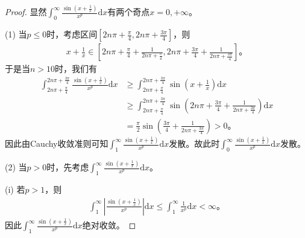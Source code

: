 \documentclass[../../main.tex]{subfiles}%
\begin{document}
\begin{proof}

显然\(\int_0^{\infty}{\frac{\sin \left( x+\frac{1}{x} \right)}{x^p}\mathrm{d}x}\)有两个奇点\(x=0,+\infty\)。

(1) 当\(p\leqslant 0\)时，考虑区间\(\left[ 2n\pi +\frac{\pi}{4},2n\pi +\frac{3\pi}{4} \right]\)，则
\begin{align*}
x+\frac{1}{x}\in \left[ 2n\pi +\frac{\pi}{4}+\frac{1}{2n\pi +\frac{\pi}{4}},2n\pi +\frac{3\pi}{4}+\frac{1}{2n\pi +\frac{3\pi}{4}} \right]。
\end{align*}
于是当\(n>10\)时，我们有
\begin{align*}
\int_{2n\pi +\frac{\pi}{4}}^{2n\pi +\frac{3\pi}{4}}{\frac{\sin \left( x+\frac{1}{x} \right)}{x^p}\mathrm{d}x}&\geqslant \int_{2n\pi +\frac{\pi}{4}}^{2n\pi +\frac{3\pi}{4}}{\sin \left( x+\frac{1}{x} \right) \mathrm{d}x}\\
&\geqslant \int_{2n\pi +\frac{\pi}{4}}^{2n\pi +\frac{3\pi}{4}}{\sin \left( 2n\pi +\frac{3\pi}{4}+\frac{1}{2n\pi +\frac{3\pi}{4}} \right) \mathrm{d}x}\\
&=\frac{\pi}{2}\sin \left( \frac{3\pi}{4}+\frac{1}{2n\pi +\frac{3\pi}{4}} \right) >0。
\end{align*}
因此由Cauchy收敛准则可知\(\int_1^{\infty}{\frac{\sin \left( x+\frac{1}{x} \right)}{x^p}\mathrm{d}x}\)发散。故此时\(\int_0^{\infty}{\frac{\sin \left( x+\frac{1}{x} \right)}{x^p}\mathrm{d}x}\)发散。

(2) 当\(p>0\)时，先考虑\(\int_1^{\infty}{\frac{\sin \left( x+\frac{1}{x} \right)}{x^p}\mathrm{d}x}\)。

(i) 若\(p>1\)，则
\begin{align*}
\int_1^{\infty}{\left| \frac{\sin \left( x+\frac{1}{x} \right)}{x^p} \right|\mathrm{d}x}\leqslant \int_1^{\infty}{\frac{1}{x^p}\mathrm{d}x}<\infty。
\end{align*}
因此\(\int_1^{\infty}{\frac{\sin \left( x+\frac{1}{x} \right)}{x^p}\mathrm{d}x}\)绝对收敛。


\end{proof}
\end{document}
